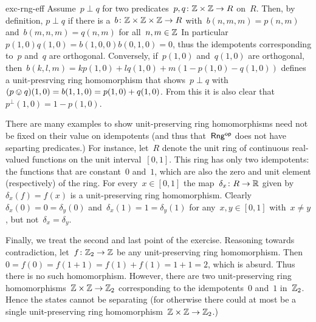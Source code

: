 \begin{solution}{exc-rng-eff}
Assume~$p \perp q$ for two predicates~$p,q \colon \mathbb{Z}\times\mathbb{Z} \to R$
    on~$R$.
Then, by definition, $p \perp q$ if
        there is a~$b\colon \mathbb{Z}\times\mathbb{Z}\times\mathbb{Z}\to R$
    with~$b(n,m,m) = p(n,m)$
    and~$b(m,n,m) = q(n,m)$ for all~$n,m \in \mathbb{Z}$
In particular~$p(1,0)q(1,0) = b(1,0,0)b(0,1,0) = 0$,
    thus the idempotents corresponding to~$p$ and~$q$ are orthogonal.
Conversely, if~$p(1,0)$ and~$q(1,0)$ are orthogonal,
    then~$b(k,l,m) = k p(1,0) + l q(1,0) + m (1-p(1,0) - q(1,0))$
        defines a unit-presrving ring homomorphism
        that shows~$p \perp q$ with~$(p \ovee q)(1,0)
            = b(1,1,0) = p(1,0) + q(1,0)$.
From this it is also clear that~$p^\perp(1,0) = 1 - p(1,0)$.

There are many examples to show unit-preserving ring homomorphisms
    need not be fixed on their value on idempotents
        (and thus that~${\mathsf{Rng}}{^{\mathsf{op}}}$ does not have separting predicates.)
For instance, let~$R$ denote the unit ring of continuous real-valued
    functions on the unit interval~$[0,1]$.
This ring has only two idempotents: the functions that are constant~$0$
    and~$1$, which are also the zero and unit element (respectively)
    of the ring.
For every~$x \in [0,1]$
    the map~$\delta_x \colon R \to \mathbb{R}$ given by~$\delta_x(f) =f(x)$
    is a unit-preserving ring homomorphism.
Clearly~$\delta_x(0) = 0 = \delta_y(0)$ and~$\delta_x(1) = 1 = \delta_y(1)$
    for any~$x,y \in [0,1]$ with~$x\neq y$, but not~$\delta_x = \delta_y$.

Finally, we treat the second and last point of the exercise.
Reasoning towards contradiction,
    let~$f\colon \mathbb{Z}_2 \to \mathbb{Z}$ be any unit-preserving ring homomorphism.
Then~$0 = f(0) = f(1+1) = f(1) + f(1) = 1 + 1 = 2$, which is absurd.
Thus there is no such homomorphism.
However, there are two unit-preserving ring
    homomorphisms~$\mathbb{Z} \times \mathbb{Z} \to \mathbb{Z}_2$
    corresponding to the idempotents~$0$ and~$1$ in~$\mathbb{Z}_2$.
Hence the states cannot be separating (for otherwise
    there could at most be a single unit-preserving
    ring homomorphism~$\mathbb{Z}\times\mathbb{Z}\to\mathbb{Z}_2$.)
\end{solution}
